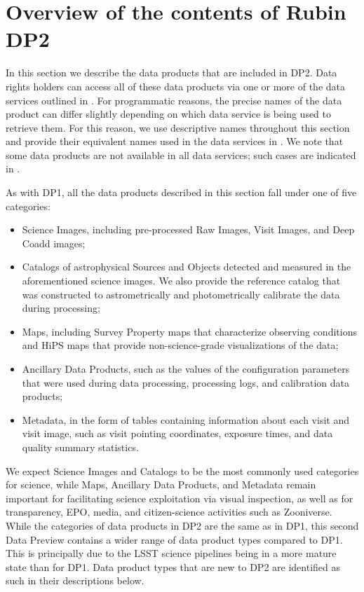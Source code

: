 \section{Overview of the contents of Rubin \gls{DP2}}
\label{sec:data_products}
In this section we describe the data products that are included in DP2.
Data rights holders can access all of these data products via one or more of the data services outlined in .
For programmatic reasons, the precise names of the data product can differ slightly depending on which data service is being used to retrieve them.
For this reason, we use descriptive names throughout this section and provide their equivalent names used in the data services in .
We note that some data products are not available in all data services; such cases are indicated in .



As with \gls{DP1}, all the data products described in this section fall under one of five categories:
\begin{itemize}
	\item Science Images, including pre-processed Raw Images, \glspl{Visit Image}, and Deep Coadd images;
	\item Catalogs of astrophysical Sources and Objects detected and measured in the aforementioned science images.
	      We also provide the reference catalog that was constructed to astrometrically and photometrically calibrate the data during processing;
	\item Maps, including Survey Property maps that characterize observing conditions and HiPS maps that provide non-science-grade visualizations of the data;
	\item Ancillary Data Products, such as the values of the configuration parameters that were used during data processing, processing logs, and \gls{calibration} data products;
	\item Metadata, in the form of tables containing information about each visit and visit image, such as visit pointing coordinates, exposure times, and data quality summary statistics.
\end{itemize}

We expect Science Images and Catalogs to be the most commonly used categories for science, while Maps, Ancillary Data Products, and Metadata remain important for facilitating science exploitation via visual inspection, as well as for transparency, \gls{EPO}, media, and citizen-science activities such as Zooniverse.
While the categories of data products in DP2 are the same as in \gls{DP1}, this second Data Preview contains a wider range of data product types compared to \gls{DP1}.
This is principally due to the LSST science pipelines being in a more mature state than for \gls{DP1}.
Data product types that are new to \gls{DP2} are identified as such in their descriptions below.

